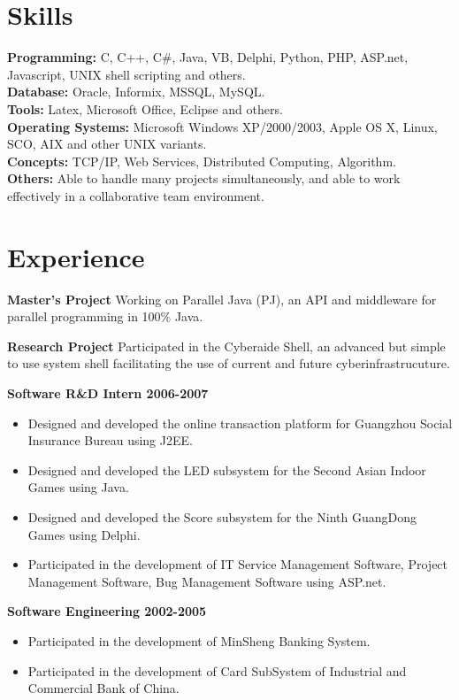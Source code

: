 \documentclass[margin]{res}
\begin{document}
\begin{resume}
\section{Skills}
{\bf Programming:} C, C++, C\#, Java, VB, Delphi, Python, PHP, ASP.net, Javascript, UNIX shell scripting and others. \\
{\bf Database:} Oracle, Informix, MSSQL, MySQL.\\
{\bf Tools:} Latex, Microsoft Office, Eclipse and others.\\
{\bf Operating Systems:} Microsoft Windows XP/2000/2003, Apple OS X, Linux, SCO, AIX and other UNIX variants.\\
{\bf Concepts:} TCP/IP, Web Services, Distributed Computing, Algorithm.\\
{\bf Others:} Able to handle many projects simultaneously, and able to work effectively in a collaborative team environment.\\

\section{Experience}
{\bf Master's Project}
Working on Parallel Java (PJ), an API and middleware for parallel programming in 100\% Java.

{\bf Research Project}
Participated in the Cyberaide Shell, an advanced but simple to use system shell facilitating the use of current and future cyberinfrastrucuture.

{\bf Software R\&D Intern 2006-2007} 
\begin{itemize}
\item Designed and developed the online transaction platform for Guangzhou Social Insurance Bureau using J2EE.
\item Designed and developed the LED subsystem for the Second Asian Indoor Games using Java.
\item Designed and developed the Score subsystem for the Ninth GuangDong Games using Delphi. 
\item Participated in the development of IT Service Management Software, Project Management Software, Bug Management Software using ASP.net. 
\end{itemize}
{\bf Software Engineering 2002-2005} 
\begin{itemize}
\item Participated in the development of MinSheng Banking System. 
\item Participated in the development of Card SubSystem of Industrial and Commercial Bank of China.
\end{itemize}


\end{resume}
\end{document}

